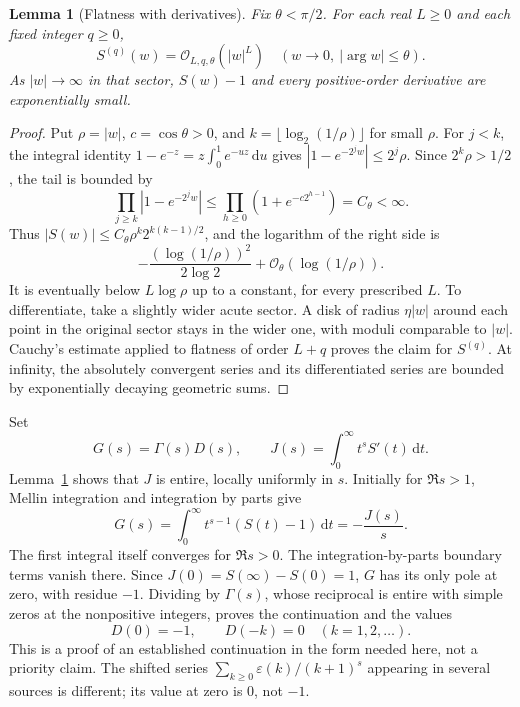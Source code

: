 \documentclass[11pt,letterpaper]{article}
\newtheorem{lemma}[theorem]{Lemma}
\theoremstyle{remark}\newtheorem{remark}[theorem]{Remark}
\newcommand{\eps}{\varepsilon}
\newcommand{\dd}{\,\mathrm d}
\newcommand{\OO}{\mathcal O}
\begin{document}
\begin{lemma}[Flatness with derivatives]\label{oep:lem:flatness}
Fix $\theta<\pi/2$. For each real $L\geq0$ and each fixed integer $q\geq0$,
\[
 S^{(q)}(w)=\OO_{L,q,\theta}(|w|^L)
 \quad(w\longrightarrow0,\ |\arg w|\leq\theta).
\]
As $|w|\to\infty$ in that sector, $S(w)-1$ and every positive-order derivative are exponentially small.
\end{lemma}
\begin{proof}
Put $\rho=|w|$, $c=\cos\theta>0$, and $k=\lfloor\log_2(1/\rho)\rfloor$ for small $\rho$. For $j<k$, the integral identity
$1-e^{-z}=z\int_0^1e^{-uz}\dd u$ gives $|1-e^{-2^jw}|\leq2^j\rho$. Since $2^k\rho>1/2$, the tail is bounded by
\[
 \prod_{j\geq k}|1-e^{-2^jw}|
 \leq\prod_{h\geq0}(1+e^{-c2^{h-1}})=C_\theta<\infty.
\]
Thus $|S(w)|\leq C_\theta\rho^k2^{k(k-1)/2}$, and the logarithm of the right side is
\[
 -\frac{(\log(1/\rho))^2}{2\log2}+\OO_\theta(\log(1/\rho)).
\]
It is eventually below $L\log\rho$ up to a constant, for every prescribed $L$. To differentiate, take a slightly wider acute sector. A disk of radius $\eta|w|$ around each point in the original sector stays in the wider one, with moduli comparable to $|w|$. Cauchy's estimate applied to flatness of order $L+q$ proves the claim for $S^{(q)}$. At infinity, the absolutely convergent series and its differentiated series are bounded by exponentially decaying geometric sums.
\end{proof}

Set
\begin{equation}\label{oep:eq:GJ}
 G(s)=\Gamma(s)D(s),\qquad J(s)=\int_0^\infty t^s S'(t)\dd t.
\end{equation}
Lemma~\ref{oep:lem:flatness} shows that $J$ is entire, locally uniformly in $s$. Initially for $\Re s>1$, Mellin integration and integration by parts give
\begin{equation}\label{oep:eq:G}
 G(s)=\int_0^\infty t^{s-1}(S(t)-1)\dd t=-\frac{J(s)}s.
\end{equation}
The first integral itself converges for $\Re s>0$. The integration-by-parts boundary terms vanish there. Since $J(0)=S(\infty)-S(0)=1$, $G$ has its only pole at zero, with residue $-1$. Dividing by $\Gamma(s)$, whose reciprocal is entire with simple zeros at the nonpositive integers, proves the continuation and the values
\begin{equation}\label{oep:eq:Dvalues}
 D(0)=-1,\qquad D(-k)=0\quad(k=1,2,\ldots).
\end{equation}
This is a proof of an established continuation in the form needed here, not a priority claim. The shifted series $\sum_{k\geq0}\eps(k)/(k+1)^s$ appearing in several sources is different; its value at zero is $0$, not $-1$.
\end{document}
